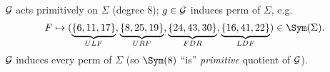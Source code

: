 \begin{slide}
    \begin{center}
    \end{center}

    $\mathcal{G}$ acts primitively on $\Sigma$ (degree 8); $g \in \mathcal{G}$ induces perm of $\Sigma$, e.g. \pause
    $$F \mapsto (\underbrace{\{6,11,17\}}_{ULF},\underbrace{\{8,25,19\}}_{URF},\underbrace{\{24,43,30\}}_{FDR},\underbrace{\{16,41,22\}}_{LDF}) \in \Sym(\Sigma).$$ \pause
    $\mathcal{G}$ induces every perm of $\Sigma$ (so $\Sym(8)$ ``is'' \textit{primitive} quotient of $\mathcal{G}$).
\end{slide}